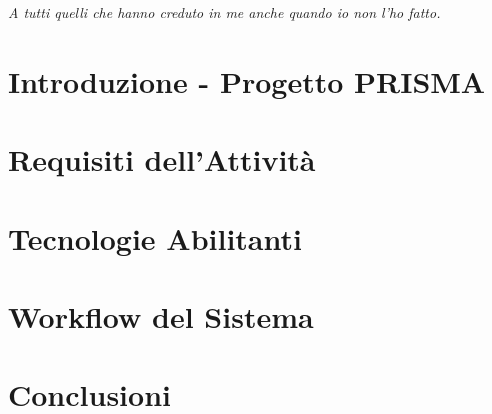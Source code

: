 \documentclass[12pt, twoside]{report}
\begin{document}
%  


\restoregeometry
{}

\newpage
\thispagestyle{empty}
\begin{flushright}
\null{}
\textit{A tutti quelli che hanno creduto in me anche quando io non l'ho fatto.}
\null
\end{flushright}

\tableofcontents

\chapter{Introduzione - Progetto PRISMA}


\chapter{Requisiti dell'Attività}


\chapter{Tecnologie Abilitanti}


\chapter{Workflow del Sistema}


\chapter{Conclusioni}


\newpage
{}
\printbibliography[title={Sitografia}]
\end{document}

